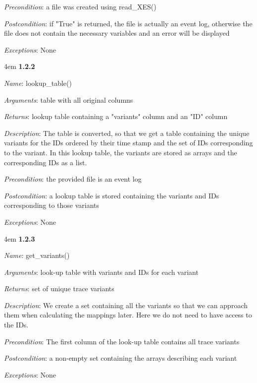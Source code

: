 \documentclass[notitlepage]{article}
\begin{document}
\begin{flushleft}
\textit{Precondition}: a file was created using read\_XES()

\textit{Postcondition}: if "True" is returned, the file is actually an event log, otherwise the file does not contain the necessary variables and an error will be displayed

\textit{Exceptions}: None
\par
\endgroup

\medskip

\par
\begingroup
\leftskip4em
\textbf{1.2.2}

\textit{Name}: lookup\_table()

\textit{Arguments}: table with all original columns

\textit{Returns}: lookup table containing a "variants" column and an "ID" column

\textit{Description}: The table is converted, so that we get a table containing the unique variants for the IDs ordered by their time stamp and the set of IDs corresponding to the variant. In this lookup table, the variants are stored as arrays and the corresponding IDs as a list.

\textit{Precondition}: the provided file is an event log

\textit{Postcondition}: a lookup table is stored containing the variants and IDs corresponding to those variants

\textit{Exceptions}: None

\par
\endgroup

\medskip

\par
\begingroup
\leftskip4em
\textbf{1.2.3}

\textit{Name}: get\_variants()

\textit{Arguments}: look-up table with variants and IDs for each variant

\textit{Returns}: set of unique trace variants

\textit{Description}: We create a set containing all the variants so that we can approach them when calculating the mappings later. Here we do not need to have access to the IDs.

\textit{Precondition}: The first column of the look-up table contains all trace variants

\textit{Postcondition}: a non-empty set containing the arrays describing each variant

\textit{Exceptions}: None


\end{flushleft}
\end{document}
